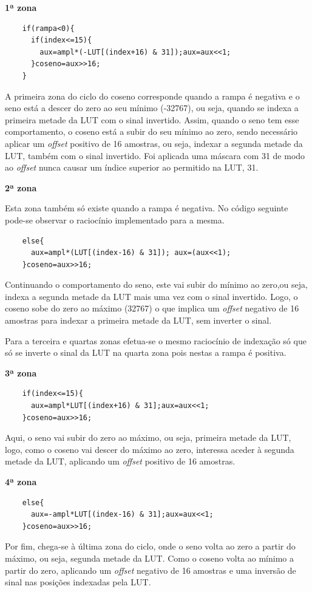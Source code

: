 \documentclass[11pt]{article}
\numberwithin{equation}{section}
\begin{document}
\textbf{1ª zona}
\begin{lstlisting}
	if(rampa<0){
	  if(index<=15){
	    aux=ampl*(-LUT[(index+16) & 31]);aux=aux<<1;
	  }coseno=aux>>16;
	}
\end{lstlisting}
A primeira zona do ciclo do coseno corresponde quando a rampa é negativa e o seno está a descer do zero ao seu mínimo (-32767), ou seja, quando se indexa a primeira metade da LUT com o sinal invertido. Assim, quando o seno tem esse comportamento, o coseno está a subir do seu mínimo ao zero, sendo necessário aplicar um \textit{offset} positivo de 16 amostras, ou seja, indexar a segunda metade da LUT, também com o sinal invertido. Foi aplicada uma máscara com 31 de modo ao \textit{offset} nunca causar um índice superior ao permitido na LUT, 31.
\vspace{1mm}

\textbf{2ª zona}

Esta zona também só existe quando a rampa é negativa. No código seguinte pode-se observar o raciocínio implementado para a mesma.
\begin{lstlisting}
	else{
	  aux=ampl*(LUT[(index-16) & 31]); aux=(aux<<1);
	}coseno=aux>>16;
\end{lstlisting}
Continuando o comportamento do seno, este vai subir do mínimo ao zero,ou seja, indexa a segunda metade da LUT mais uma vez com o sinal invertido. Logo, o coseno sobe do zero ao máximo (32767) o que implica um \textit{offset} negativo de 16 amostras para indexar a primeira metade da LUT, sem inverter o sinal.

Para a terceira e quartas zonas efetua-se o mesmo raciocínio de indexação só que só se inverte o sinal da LUT na quarta zona pois nestas a rampa é positiva.
\vspace{1mm}

\textbf{3ª zona}
\begin{lstlisting}
	if(index<=15){
	  aux=ampl*LUT[(index+16) & 31];aux=aux<<1;
	}coseno=aux>>16;
\end{lstlisting}
Aqui, o seno vai subir do zero ao máximo, ou seja, primeira metade da LUT, logo, como o coseno vai descer do máximo ao zero, interessa aceder à segunda metade da LUT, aplicando um \textit{offset} positivo de 16 amostras.
\vspace{1mm}

\textbf{4ª zona}
\begin{lstlisting}
	else{
	  aux=-ampl*LUT[(index-16) & 31];aux=aux<<1;
	}coseno=aux>>16;
\end{lstlisting}
Por fim, chega-se à última zona do ciclo, onde o seno volta ao zero a partir do máximo, ou seja, segunda metade da LUT. Como o coseno volta ao mínimo a partir do zero, aplicando um \textit{offset} negativo de 16 amostras e uma inversão de sinal nas posições indexadas pela LUT.
\end{document}
